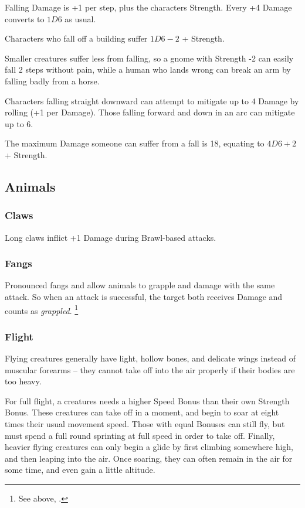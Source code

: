 \begin{multicols}{2}

Falling Damage is +1 per \gls{step}, plus the characters Strength.
Every +4 Damage converts to $1D6$ as usual.

Characters who fall off a building suffer $1D6-2$ + Strength.

Smaller creatures suffer less from falling, so a gnome with Strength -2 can easily fall 2 \glspl{step} without pain, while a human who lands wrong can break an arm by falling badly from a horse.

Characters falling straight downward can attempt to mitigate up to 4 Damage by rolling  (\tn[5] +1 per Damage).
Those falling forward and down in an arc can mitigate up to 6.

The maximum Damage someone can suffer from a fall is 18, equating to $4D6+2$ + Strength.

\subsection{Animals}

\subsubsection{Claws}
\label{claws}
Long claws inflict +1 Damage during Brawl-based attacks.

\subsubsection{Fangs}
\label{teeth}
\label{fangs}

Pronounced fangs and allow animals to grapple and damage with the same attack.
So when an attack is successful, the target both receives Damage and counts as \textit{grappled}.%
\footnote{See above, .}

\subsubsection{Flight}

Flying creatures generally have light, hollow bones, and delicate wings instead of muscular forearms -- they cannot take off into the air properly if their bodies are too heavy.

For full flight, a creatures needs a higher Speed Bonus than their own Strength Bonus.
These creatures can take off in a moment, and begin to soar at eight times their usual movement speed.
Those with equal Bonuses can still fly, but must spend a full round sprinting at full speed in order to take off.
Finally, heavier flying creatures can only begin a glide by first climbing somewhere high, and then leaping into the air.
Once soaring, they can often remain in the air for some time, and even gain a little altitude.


\end{multicols}
